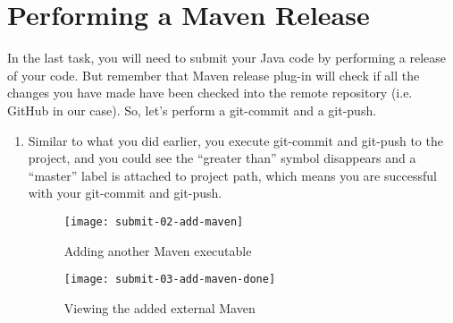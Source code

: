 
\section{Performing a Maven Release}

In the last task, you will need to submit your Java code by performing a release
of your code. But remember that Maven release plug-in will check if all the
changes you have made have been checked into the remote repository (i.e. GitHub
in our case). So, let's perform a git-commit and a git-push.

\begin{enumerate}

\begin{figure}
\hspace{-1em}
\begin{minipage}{0.5\textwidth}
\centering
\texttt{[image: simple-code-05-commit]}
\caption{Performing a git-commit/push before preparing a release\label{simple-code-05-commit}}
\end{minipage}
\hfill
\begin{minipage}{0.5\textwidth}
\centering
\texttt{[image: submit-01-preference]}
\caption{Starting to add an external Maven executable\label{submit-01-preference}}
\end{minipage}
\hspace{-1em}
\end{figure}

\item Similar to what you did earlier, you execute git-commit and git-push to
the project, and you could see the ``greater than'' symbol disappears and a
``master'' label is attached to project path, which means you are successful
with your git-commit and git-push.

\begin{figure}
\hspace{-2em}
\begin{minipage}{0.5\textwidth}
\centering
\texttt{[image: submit-02-add-maven]}
\caption{Adding another Maven executable\label{submit-02-add-maven}}
\end{minipage}
\hfill
\begin{minipage}{0.5\textwidth}
\centering
\texttt{[image: submit-03-add-maven-done]}
\caption{Viewing the added external Maven\label{submit-03-add-maven-done}}
\end{minipage}
\hspace{-2em}
\end{figure}


\end{enumerate}
